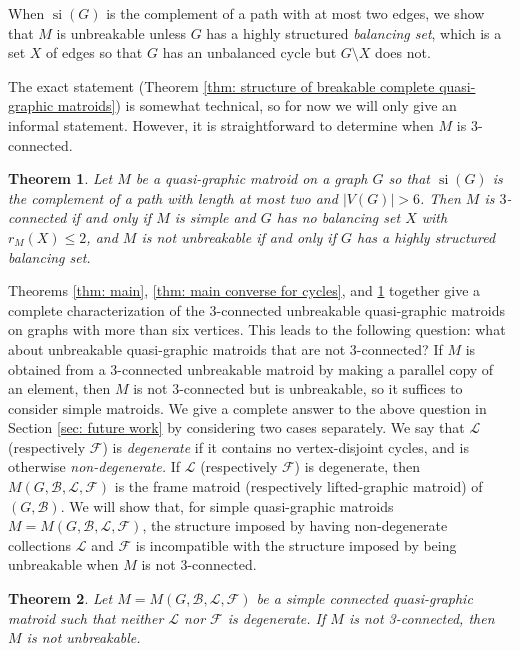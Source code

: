 \documentclass[12pt]{article}
\newtheorem{theorem}{Theorem}[section]
\theoremstyle{definition}
\theoremstyle{plain} %
\newcommand{\cB}{\mathcal{B}}
\newcommand{\cF}{\mathcal{F}}
\newcommand{\cL}{\mathcal{L}}
\DeclareMathOperator{\si}{si}
\newcommand{\del}{\!\setminus\!}
\newcommand{\qbg}{\ensuremath{(G,\cB,\cL,\cF)}}
\begin{document}
When $\si(G)$ is the complement of a path with at most two edges,
we show that $M$ is unbreakable unless $G$ has a highly structured \emph{balancing set}, which is a set $X$ of edges so that $G$ has an unbalanced cycle but $G \del X$ does not.

The exact statement (Theorem \ref{thm: structure of breakable complete quasi-graphic matroids}) is somewhat technical, so for now we will only give an informal statement. 
However, it is straightforward to determine when $M$ is $3$-connected.

\begin{theorem} \label{thm: main converse for nearly complete graphs}
Let $M$ be a quasi-graphic matroid on a graph $G$ so that $\si(G)$ is the complement of a path with length at most two and $|V(G)| > 6$.
Then $M$ is $3$-connected if and only if $M$ is simple and $G$ has no balancing set $X$ with $r_M(X) \le 2$, and $M$ is not unbreakable if and only if $G$ has a highly structured balancing set.
\end{theorem}


Theorems \ref{thm: main}, \ref{thm: main converse for cycles}, and \ref{thm: main converse for nearly complete graphs} together give a complete characterization of the $3$-connected unbreakable quasi-graphic matroids on graphs with more than six vertices.
This leads to the following question: what about unbreakable quasi-graphic matroids that are not $3$-connected? 
If $M$ is obtained from a $3$-connected unbreakable matroid by making a parallel copy of an element, then $M$ is not $3$-connected but is unbreakable, so it suffices to consider simple matroids.
We give a complete answer to the above question in Section \ref{sec: future work} by considering two cases separately.
We say that $\cL$ (respectively $\cF$) is \emph{degenerate} if it contains no vertex-disjoint cycles, and is otherwise \emph{non-degenerate.} If $\cL$ (respectively $\cF$) is degenerate, then $M\qbg$ is the frame matroid (respectively lifted-graphic matroid) of $(G,\cB)$.
We will show that, for simple quasi-graphic matroids $M=M\qbg$, the structure imposed by having non-degenerate collections $\cL$ and $\cF$ is incompatible with the structure imposed by being unbreakable when $M$ is not $3$-connected.


\begin{theorem}\label{thm: non-degen unbreakability}
   Let $M=M\qbg$ be a simple connected quasi-graphic matroid such that neither $\cL$ nor $\cF$ is degenerate. If $M$ is not 3-connected, then $M$ is not unbreakable.
\end{theorem}
\end{document}
